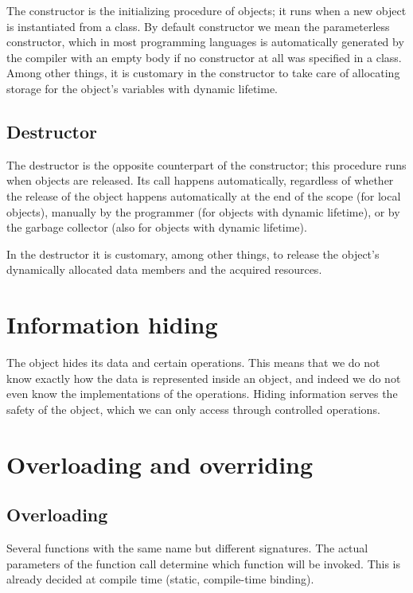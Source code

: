 \documentclass[margin=0px]{article}
\begin{document}
The constructor is the initializing procedure of objects; it runs when a new object is instantiated from a class. By default constructor we mean the parameterless constructor, which in most programming languages is automatically generated by the compiler with an empty body if no constructor at all was specified in a class.
Among other things, it is customary in the constructor to take care of allocating storage for the object's variables with dynamic lifetime.

\subsection{Destructor}

The destructor is the opposite counterpart of the constructor; this procedure runs when objects are released. Its call happens automatically, regardless of whether the release of the object happens automatically at the end of the scope (for local objects), manually by the programmer (for objects with dynamic lifetime), or by the garbage collector (also for objects with dynamic lifetime).

In the destructor it is customary, among other things, to release the object's dynamically allocated data members and the acquired resources.

\section{Information hiding}
The object hides its data and certain operations. This means that we do not know exactly how the data is represented inside an object, and indeed we do not even know the implementations of the operations. Hiding information serves the safety of the object, which we can only access through controlled operations.

\section{Overloading and overriding}

\subsection{Overloading}

Several functions with the same name but different signatures. The actual parameters of the function call determine which function will be invoked. This is already decided at compile time (static, compile-time binding).
\end{document}
